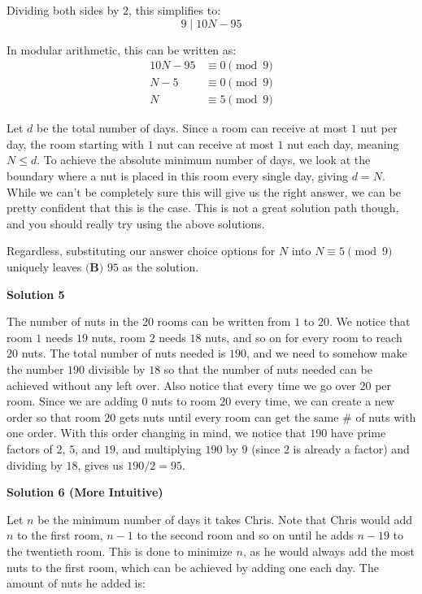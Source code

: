 \begin{enumerate}
 Dividing both sides by $2$, this simplifies to:
 \[9 \mid 10N - 95\]

 In modular arithmetic, this can be written as:\begin{align*}10N - 95 &\equiv 0 \pmod 9 \\N - 5 &\equiv 0 \pmod 9 \\N &\equiv 5 \pmod 9\end{align*}


 Let $d$ be the total number of days. Since a room can receive at most $1$ nut per day, the room starting with $1$ nut can receive at most $1$ nut each day, meaning $N \le d$. To achieve the absolute minimum number of days, we look at the boundary where a nut is placed in this room every single day, giving $d = N$. While we can't be completely sure this will give us the right answer, we can be pretty confident that this is the case. This is not a great solution path though, and you should really try using the above solutions. 

 Regardless, substituting our answer choice options for $N$ into $N \equiv 5 \pmod 9$ uniquely leaves $\boxed{\textbf{(B) } 95}$ as the solution.

 



\textbf{Solution 5}

The number of nuts in the 20 rooms can be written from $1$ to $20$. We notice that room $1$ needs $19$ nuts, room $2$ needs $18$ nuts, and so on for every room to reach $20$ nuts. The total number of nuts needed is $190$, and we need to somehow make the number $190$ divisible by $18$ so that the number of nuts needed can be achieved without any left over. Also notice that every time we go over $20$ per room. Since we are adding $0$ nuts to room $20$ every time, we can create a new order so that room $20$ gets nuts until every room can get the same \# of nuts with one order. With this order changing in mind, we notice that $190$ have prime factors of $2$, $5$, and $19$, and multiplying $190$ by $9$ (since $2$ is already a factor) and dividing by $18$, gives us $190/2 = 95$.

 


 



\textbf{Solution 6 (More Intuitive)}

Let $n$ be the minimum number of days it takes Chris. Note that Chris would add $n$ to the first room, $n- 1$ to the second room and so on until he adds $n - 19$ to the twentieth room. This is done to minimize $n$, as he would always add the most nuts to the first room, which can be achieved by adding one each day. The amount of nuts he added is:


\end{enumerate}
